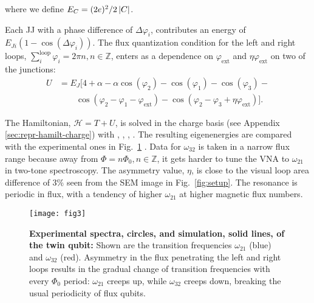 \noindent where we define $ E_{C}={(2e)^{2}}/{2 \left|C\right| } $.

Each  JJ  with  a  phase  difference  of  $\Delta\varphi_{i}$,  contributes  an  energy  of
$ E_{Ji}\left(1 - \cos(\Delta\varphi_i)\right) $.   The flux quantization condition for the
left                     and                    right                     loops,
$ \sum_{i}^{\text{loop}}  \varphi_i = 2\pi  n, n \in \mathbb{Z}$,  enters as a  dependence on
$ \varphi_\text{ext} $ and $ \eta\varphi_\text{ext} $ on two of the junctions:
\begin{equation}\label{eq:potential}
  \begin{aligned}
    U & = E_J\big[4 + \alpha - \alpha\cos(\varphi_{2}) -\cos(\varphi_{1}) -\cos(\varphi_{3}) - \\
    &  \qquad  \cos(\varphi_{2}   -  \varphi_{1}  -  \varphi_{\text{ext}})  -  \cos(\varphi_{2}   -  \varphi_{3}  +
    \eta\varphi_{\text{ext}})\big].
  \end{aligned}
\end{equation}

The  Hamiltonian, $\mathcal{H}= T + U$, is  solved  in  the charge  basis (see  Appendix
\ref{sec:repr-hamilt-charge})  with
, , , . The resulting eigenenergies   are    compared    with    the    experimental    ones    in
Fig.~\ref{fig:experiment} .  Data for $ \omega_{32} $ is taken in a narrow flux range
because away from $ \Phi = n \Phi_0, n\in\mathbb{Z} $, it gets harder to tune the VNA to
$ \omega_{21} $  in two-tone spectroscopy.  The  asymmetry value, $ \eta $,  is close to
the  visual   loop  area  difference  of   3\%  seen  from  the   SEM  image  in
Fig.~\ref{fig:setup}.  The  resonance is  periodic in flux,  with a  tendency of
higher $\omega_{21}$ at higher magnetic flux numbers.

\begin{figure}[h]
  \texttt{[image: fig3]}
  \caption{\small \textbf{Experimental  spectra, circles, and  simulation, solid
      lines,  of  the   twin  qubit:}  Shown  are   the  transition  frequencies
    $ \omega_{21}  $ (blue) and $  \omega_{32}$ (red).  Asymmetry in  the flux penetrating
    the  left and  right  loops  results in  the  gradual  change of  transition
    frequencies  with  every  $  \Phi_{0}  $  period:  $\omega_{21}$  creeps  up,  while
    $\omega_{32}$   creeps   down,   breaking   the   usual   periodicity   of   flux
    qubits.  \label{fig:experiment}}
\end{figure}
 
